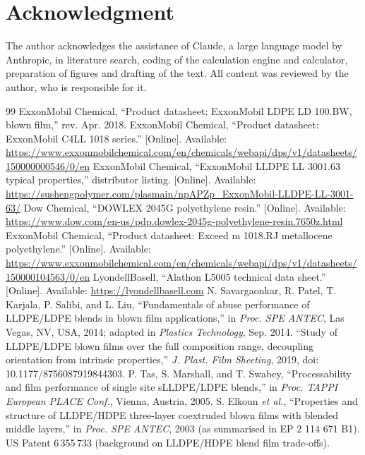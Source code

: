 \documentclass[conference,a4paper]{IEEEtran}
\begin{document}
\section*{Acknowledgment}
The author acknowledges the assistance of Claude, a large language model by Anthropic, in literature search, coding of the calculation engine and calculator, preparation of figures and drafting of the text. All content was reviewed by the author, who is responsible for it.

\balance
\begin{thebibliography}{99}
\footnotesize
{} ExxonMobil Chemical, ``Product datasheet: ExxonMobil LDPE LD 100.BW, blown film,'' rev. Apr. 2018.
 ExxonMobil Chemical, ``Product datasheet: ExxonMobil C4LL 1018 series.'' [Online]. Available: \url{https://www.exxonmobilchemical.com/en/chemicals/webapi/dps/v1/datasheets/150000000546/0/en}
 ExxonMobil Chemical, ``ExxonMobil LLDPE LL 3001.63 typical properties,'' distributor listing. [Online]. Available: \url{https://sushengpolymer.com/plasmain/npAPZp_ExxonMobil-LLDPE-LL-3001-63/}
 Dow Chemical, ``DOWLEX 2045G polyethylene resin.'' [Online]. Available: \url{https://www.dow.com/en-us/pdp.dowlex-2045g-polyethylene-resin.7650z.html}
 ExxonMobil Chemical, ``Product datasheet: Exceed m 1018.RJ metallocene polyethylene.'' [Online]. Available: \url{https://www.exxonmobilchemical.com/en/chemicals/webapi/dps/v1/datasheets/150000104563/0/en}
 LyondellBasell, ``Alathon L5005 technical data sheet.'' [Online]. Available: \url{https://lyondellbasell.com}
 N. Savargaonkar, R. Patel, T. Karjala, P. Salibi, and L. Liu, ``Fundamentals of abuse performance of LLDPE/LDPE blends in blown film applications,'' in \emph{Proc. SPE ANTEC}, Las Vegas, NV, USA, 2014; adapted in \emph{Plastics Technology}, Sep. 2014.
 ``Study of LLDPE/LDPE blown films over the full composition range, decoupling orientation from intrinsic properties,'' \emph{J. Plast. Film Sheeting}, 2019, doi: 10.1177/8756087919844303.
 P. Tas, S. Marshall, and T. Swabey, ``Processability and film performance of single site sLLDPE/LDPE blends,'' in \emph{Proc. TAPPI European PLACE Conf.}, Vienna, Austria, 2005.
 S. Elkoun \emph{et al.}, ``Properties and structure of LLDPE/HDPE three-layer coextruded blown films with blended middle layers,'' in \emph{Proc. SPE ANTEC}, 2003 (as summarised in EP 2 114 671 B1).
 US Patent 6\,355\,733 (background on LLDPE/HDPE blend film trade-offs).

\end{thebibliography}
\end{document}
